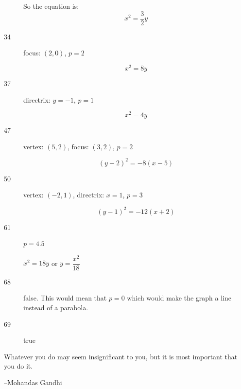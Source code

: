 \documentclass[fleqn,addpoints]{exam}
\begin{document}
\begin{description}
So the equation is:
\[
  x^2 = \frac{3}{2} y
\]

\item[34]
focus: $(2, 0)$, $p = 2$

\[
  x^2 = 8y
\]

\item[37]
directrix: $y = -1$, $p = 1$

\[
  x^2 = 4y
\]

\item[47]
vertex: $(5, 2)$, focus: $(3, 2)$, $p = 2$

\[
(y-2)^2 = -8(x-5)
\]

\item[50]
vertex: $(-2, 1)$, directrix: $x=1$, $p = 3$

\[
  (y-1)^2 = -12(x+2)
\]

\item[61]
$p = 4.5$

$x^2 = 18y$ or $y = \dfrac{x^2}{18}$


\item[68]
false.  This would mean that $p=0$ which would make the graph a line instead of a parabola.

\item[69]
true

\end{description}


\else

\vspace{4 in}

\begin{em}
Whatever you do may seem insignificant to you, but it is most important that you do it. 
\end{em}

\vspace{.2 cm}
\hspace{1.5 cm} --Mohandas Gandhi 

\fi
\end{document}

